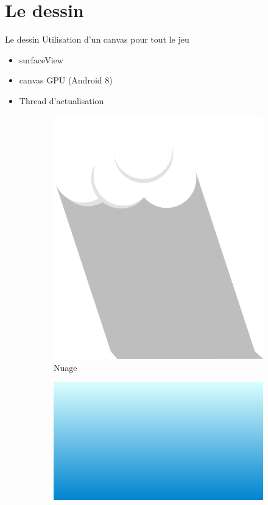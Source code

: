\documentclass[t,12pt]{beamer}
\begin{document}
\section{Le dessin}
\begin{frame}{Le dessin}
    Utilisation d'un canvas pour tout le jeu
    
    \begin{itemize}
        \item surfaceView
        \item canvas GPU (Android 8)
        \item Thread d'actualisation
    \end{itemize}
    
    \begin{figure}
     \centering
     \begin{subfigure}[b]{0.2\textwidth}
         \centering
         \includegraphics[width=\textwidth]{nuage}
         \caption{Nuage}
         \label{fig:Nuage}
     \end{subfigure}
     \hfill
     \begin{subfigure}[b]{0.2\textwidth}
         \centering
         \includegraphics[width=\textwidth]{ciel}

\end{subfigure}
\end{figure}
\end{frame}
\end{document}
